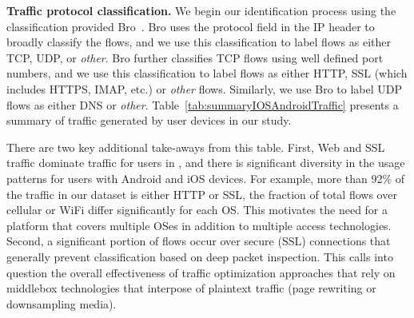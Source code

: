 \noindent\textbf{Traffic protocol classification.} We begin our identification process using the classification provided Bro~\cite{bro}.
Bro uses the protocol field in the IP header to broadly classify the flows, and we use this classification to label flows as either TCP, UDP, or \emph{other}.
Bro further classifies TCP flows using well defined port numbers, and we use this classification to label flows as either HTTP, SSL (which includes HTTPS, IMAP, etc.) or \emph{other} flows.
Similarly, we use Bro to label UDP flows as either DNS or \emph{other}. 
Table~\ref{tab:summaryIOSAndroidTraffic} presents a 
summary of traffic generated by user devices in our study. 

There are two key additional 
take-aways from this table. First, Web and SSL traffic dominate traffic for users in \mobWild, 
and there is significant diversity in the usage patterns for 
users with Android and iOS devices. For example, more than 92\% of the traffic in our \mobWild dataset is either HTTP or SSL, 
the fraction of total flows over cellular or WiFi differ significantly for each OS. This motivates the need for a platform that covers 
multiple OSes in addition to multiple access technologies. Second, a significant portion of flows occur over secure (SSL) connections 
that generally prevent classification based on deep packet inspection. This calls into question 
the overall effectiveness of traffic optimization approaches that rely 
on middlebox technologies that interpose of plaintext traffic (\eg page rewriting or downsampling media).

